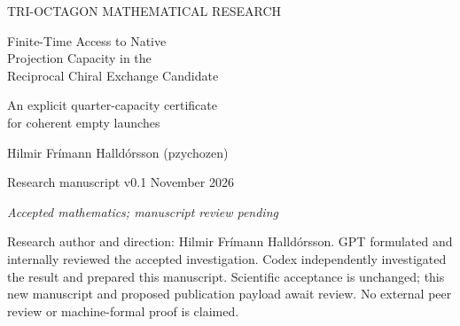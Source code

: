 \documentclass[11pt,a4paper]{article}
\numberwithin{equation}{section}
\begin{document}
\hypersetup{pageanchor=false}
\begin{titlepage}
\vspace*{2mm}
{\small\color{MidnightBlue} TRI-OCTAGON MATHEMATICAL RESEARCH\par}
\vspace{7mm}
{\LARGE\bfseries\raggedright Finite-Time Access to Native\\
Projection Capacity in the\\Reciprocal Chiral Exchange Candidate\par}
\vspace{5mm}
{\large An explicit quarter-capacity certificate\\for coherent empty launches\par}
\vspace{6mm}
{\large Hilmir Fr\'imann Halld\'orsson (pzychozen)\par}
\vspace{3mm}
{Research manuscript v0.1 November 2026\par}
{\itshape Accepted mathematics; manuscript review pending\par}
\vspace{4mm}
\begin{abstract}
The joint projection ceiling of the reciprocal chiral exchange candidate limits the native trial storage that can leave the core, but a ceiling alone does not establish access to a definite fraction of that amount. We prove an explicit finite-time certificate for the coherent family $\Omega_0=(1,e^{i\phi},1)$, $0<\phi<\pi/12$, at fixed yaw $\pi/4$, with nonzero raw drive and initially empty carrier and receiver. The original equations retain finite positive propagation, finite-width periodic profiles and constant positive couplings. First fix admitted geometry and coefficients satisfying $\sigma_{\rm ext}\le\nu/2$, where $\nu^2=\eta_N^2mk^2R^2/(2\alpha_N)$ and $\sigma_{\rm ext}^2=c^2d/m+\kappa^2m/\beta_R$. Every phase in this family then satisfies, at the same time $t_*=1/\nu$,
\[
H_C(t_*)+H_R(t_*)>\frac{1053}{4096}C_{\rm joint}
>\frac14 C_{\rm joint},\qquad
C_{\rm joint}=\alpha_N(1-\cos\phi)>0.
\]
The proof retains the evolving launch drive in a Volterra comparison and bounds both propagation and receiver residuals of a strong reference curve. Exact rational estimates give a strict margin even at equality in the sufficient rate condition, whose finite positive regime is nonempty. The numerator is combined external stock and the denominator is joint capacity, not all initial native stock. The theorem establishes neither a receiver-only fraction nor subsequent recovery of this amount on these coefficients, saturation of the ceiling, or a spatial toroidal circuit.
\end{abstract}
\vfill
{\small Research author and direction: Hilmir Fr\'imann Halld\'orsson.
GPT formulated and internally reviewed the accepted investigation.
Codex independently investigated the result and prepared this manuscript.
Scientific acceptance is unchanged; this new manuscript and proposed publication payload await review.
No external peer review or machine-formal proof is claimed.}
\end{titlepage}
\setcounter{page}{2}\hypersetup{pageanchor=true}







\clearpage
\appendix


\end{document}
